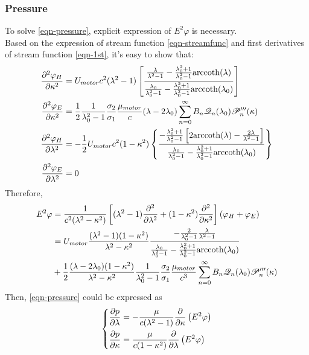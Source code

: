 \documentclass[fontsize=11pt, %
                             paper=a4, %
                             twoside, %
                             captions=tableheading,
                             index=totoc,
                             hyperref]{labbook}
\begin{document}
\subsubsection{Pressure}
To solve \ref{eqn-pressure}, explicit expression of $E^2 \varphi$ is necessary.\\
Based on the expression of stream function \ref{eqn-streamfunc} and first derivatives of stream function \ref{eqn-1st}, it's easy to show that:
\begin{equation}
\begin{aligned}
\frac{\partial^2 \varphi_H}{\partial \kappa^2}&=U_{motor}c^2(\lambda^2-1)\left[\frac{\frac{\lambda}{\lambda^2-1}-\frac{\lambda_0^2+1}{\lambda^2_0-1}\mathrm{arccoth}(\lambda)}{\frac{\lambda_0}{\lambda_0^2-1}-\frac{\lambda_0^2+1}{\lambda_0^2-1}\mathrm{arccoth}(\lambda_0)}\right]\\
\frac{\partial^2 \varphi_E}{\partial \kappa^2}&=\frac{1}{2}\frac{1}{\lambda_0^2-1}\frac{\sigma_2}{\sigma_1}\frac{\mu_{motor}}{c}(\lambda-2\lambda_0)\sum_{n=0}^\infty B_n \mathscr{Q}_n(\lambda_0)\mathscr{P}_n^{\prime\prime\prime}(\kappa)\\
\frac{\partial^2 \varphi_H}{\partial \lambda^2}&=-\frac{1}{2}U_{motor}c^2(1-\kappa^2)\left\{\frac{-\frac{\lambda_0^2+1}{\lambda_0^2-1}\left[2\mathrm{arccoth}(\lambda)-\frac{2\lambda}{\lambda^2-1}\right]}{\frac{\lambda_0}{\lambda_0^2-1}-\frac{\lambda_0^2+1}{\lambda_0^2-1}\mathrm{arccoth}(\lambda_0)}\right\}\\
\frac{\partial^2 \varphi_E}{\partial \lambda^2}&=0
\end{aligned}
\end{equation}
Therefore,
\begin{equation}
\begin{aligned}
E^2\varphi&=\frac{1}{c^2(\lambda^2-\kappa^2)}\left[(\lambda^2-1)\frac{\partial^2 }{\partial \lambda^2}+(1-\kappa^2)\frac{\partial^2 }{\partial \kappa^2}\right]\left(\varphi_H+\varphi_E\right)\\
&=U_{motor}\frac{(\lambda^2-1)(1-\kappa^2)}{\lambda^2-\kappa^2}\frac{-\frac{2}{\lambda^2_0-1}\frac{\lambda}{\lambda^2-1}}{\frac{\lambda_0}{\lambda_0^2-1}-\frac{\lambda_0^2+1}{\lambda_0^2-1}\mathrm{arccoth}(\lambda_0)}\\
&+\frac{1}{2}\frac{(\lambda-2\lambda_0)(1-\kappa^2)}{\lambda^2-\kappa^2}\frac{1}{\lambda_0^2-1}\frac{\sigma_2}{\sigma_1}\frac{\mu_{motor}}{c^3}\sum_{n=0}^\infty B_n \mathscr{Q}_n(\lambda_0)\mathscr{P}_n^{\prime\prime\prime}(\kappa)
\end{aligned}
\end{equation}
Then, \ref{eqn-pressure} could be expressed as
\begin{equation}
\left\{
\begin{aligned}
\frac{\partial p}{\partial \lambda}&=-\frac{\mu}{c(\lambda^2-1)}\frac{\partial }{\partial \kappa}\left(E^2 \varphi\right)\\
\frac{\partial p}{\partial \kappa}&=\frac{\mu}{c(1-\kappa^2)}\frac{\partial }{\partial \lambda}\left(E^2 \varphi\right)
\end{aligned}
\right.
\end{equation}
\end{document}
